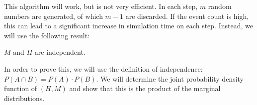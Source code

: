 \documentclass[10pt,a4paper]{article}
\begin{document}
This algorithm will work, but is not very efficient. In each step, $m$ random numbers are generated, of which $m-1$ are discarded. If the event count is high, this can lead to a significant increase in simulation time on each step. Instead, we will use the following result:

\begin{lemma} \label{lemma:independence} %
	$M$ and $H$ are independent.
\end{lemma}

In order to prove this, we will use the definition of independence: $P \left( A \cap B \right) = P \left( A \right) \cdot P \left( B \right)$. We will determine the joint probability density function of $(H, M)$ and show that this is the product of the marginal distributions.
\end{document}
